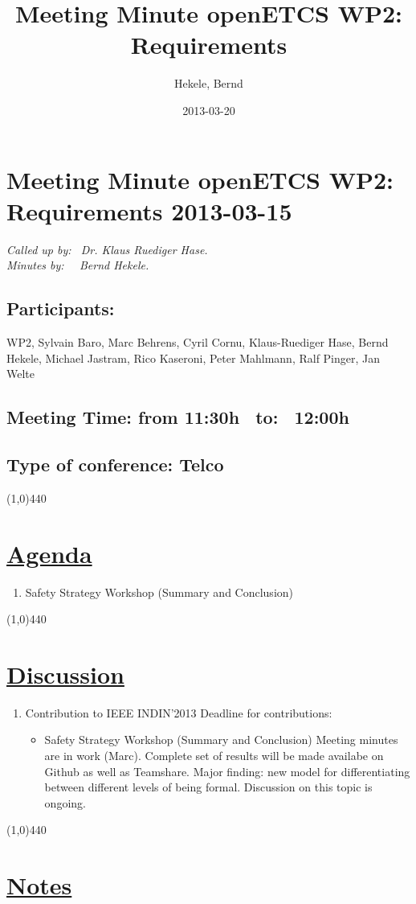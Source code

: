 \documentclass[a4paper]{article}
\title{Meeting Minute openETCS WP2: Requirements}
\author{Hekele, Bernd}
\date{2013-03-20}
\begin{document}
\section*{\large{Meeting Minute openETCS WP2: Requirements 2013-03-15}}

\emph{Called up by: \ Dr. Klaus Ruediger Hase.}\\
\emph{Minutes by: \ \  Bernd Hekele.}

\subsection*{Participants:} WP2, 
Sylvain Baro,
Marc Behrens, 
Cyril Cornu,
Klaus-Ruediger Hase, 
Bernd Hekele,
Michael Jastram, 
Rico Kaseroni,
Peter Mahlmann, 
Ralf Pinger,
Jan Welte\\


\subsection*{Meeting Time: from 11:30h \ to: \ 12:00h}

\subsection*{Type of conference: Telco}

\line(1,0){440}
\section*{\underline{Agenda}}
\begin{enumerate}
\item Safety Strategy Workshop (Summary and Conclusion)
\end{enumerate}
\line(1,0){440}
\section*{\underline{Discussion}}

\begin{enumerate}

\item Contribution to IEEE INDIN'2013\newline
Deadline for contributions:
\begin {itemize}
\item Safety Strategy Workshop (Summary and Conclusion)\newline
Meeting minutes are in work (Marc). Complete set of results will be made availabe on Github as well as Teamshare.\newline
Major finding: new model for differentiating between different levels of being formal. Discussion on this topic is ongoing.
\end {itemize}

\end{enumerate}

\line(1,0){440}
\section*{\underline{Notes}}
\end{document}
